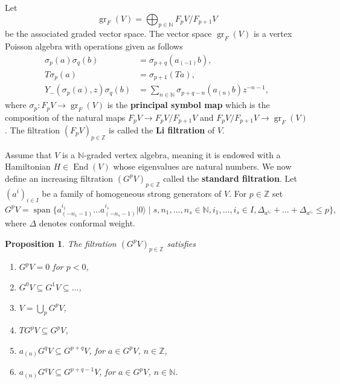 \documentclass[12pt, a4paper]{article}
\newtheorem{proposition}[theorem]{Proposition}
\theoremstyle{remark}
\DeclareMathOperator{\gr}{gr}
\DeclareMathOperator{\End}{End}
\DeclareMathOperator{\vspan}{span}
\newcommand{\vac}{|0\rangle}
\begin{document}
Let
\begin{equation*}
  \gr_F(V) = \bigoplus_{p\in \mathbb{N}}F_pV/F_{p + 1}V
\end{equation*}
be the associated graded vector space.
The vector space $\gr_F(V)$ is a vertex Poisson algebra with operations given as follows
\begin{align*}
  \sigma_p(a)\sigma_q(b) &= \sigma_{p + q}(a_{(-1)}b), \\
  T\sigma_p(a) &= \sigma_{p + 1}(Ta), \\
  Y_-(\sigma_p(a),z)\sigma_q(b) &= \sum_{n \in \mathbb{N}}\sigma_{p + q - n}(a_{(n)}b)z^{-n - 1},
\end{align*}
where $\sigma_p: F_pV \to \gr_F(V)$ is the \textbf{principal symbol map} which is the composition of the natural maps $F_pV \to F_pV/F_{p + 1}V$ and $F_pV/F_{p+1}V \to \gr_F(V)$.
The filtration $(F_pV)_{p\in \mathbb{Z}}$ is called the \textbf{Li filtration} of $V$.

Assume that $V$ is a $\mathbb{N}$-graded vertex algebra, meaning it is endowed with a Hamiltonian $H \in \End(V)$ whose eigenvalues are natural numbers.
We now define an increasing filtration $(G^pV)_{p \in \mathbb{Z}}$ called the \textbf{standard filtration}.
Let $(a^i)_{i \in I}$ be a family of homogeneous strong generators of $V$.
For $p \in \mathbb{Z}$ set
\begin{equation*}
  G^pV = \vspan\{a^{i_1}_{(-n_1 - 1)}\dots a^{i_s}_{(-n_s - 1)}\vac \mid s, n_1, \dots, n_s \in \mathbb{N}, i_1, \dots, i_s \in I, \Delta_{a^{i_1}} + \dots + \Delta_{a^{i_s}} \le p\},
\end{equation*}
where $\Delta$ denotes conformal weight.

\begin{proposition}
  \label{prp:2}
  The filtration $(G^pV)_{p\in \mathbb{Z}}$ satisfies
  \begin{enumerate}[label={(\alph*)}]
  \item $G^pV = 0$ for $p < 0$,
  \item $G^0V \subseteq G^1V \subseteq \dots$,
  \item $V = \bigcup_pG^pV$,
  \item $TG^pV \subseteq G^pV$,
  \item $a_{(n)}G^qV \subseteq G^{p + q}V$, for $a \in G^pV$, $n \in \mathbb{Z}$,
  \item $a_{(n)}G^qV \subseteq G^{p + q - 1}V$, for $a \in G^pV$, $n \in \mathbb{N}$.
  \end{enumerate}
\end{proposition}
\end{document}
